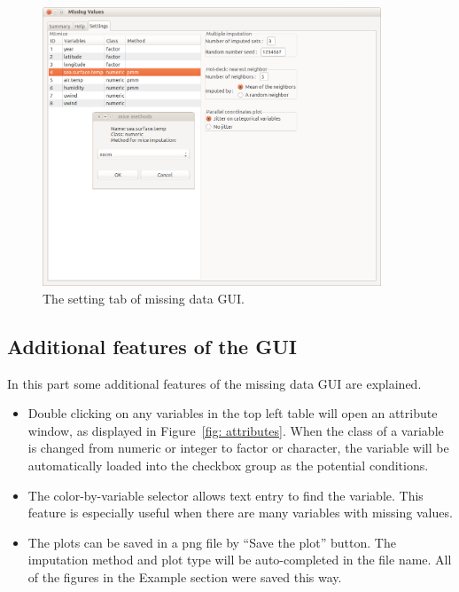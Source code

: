 \documentclass[article]{jss}
\begin{document}
\begin{center}
\begin{figure}[h]
\begin{centering}
\includegraphics[width=0.9\textwidth]{graph/fig1-GUI-tab3}
\par\end{centering}
\caption{The setting tab of missing data GUI.}
\label{fig: missingGUI-setting}
\end{figure}
\par\end{center}


\subsection{Additional features of the GUI}
In this part some additional features of the missing data GUI are explained.
\begin{itemize}
\item Double clicking on any variables in the top left table will open an attribute window, as displayed in Figure~\ref{fig: attributes}. When the class of a variable is changed from numeric or integer to factor or character, the variable will be automatically loaded into the checkbox group as the potential conditions.
\item The color-by-variable selector allows text entry to find the variable. This feature is especially useful when there are many variables with missing values.
\item The plots can be saved in a png file by ``Save the plot'' button. The imputation method and plot type will be auto-completed in the file name. All of the figures in the Example section were saved this way.
\end{itemize}
\end{document}
